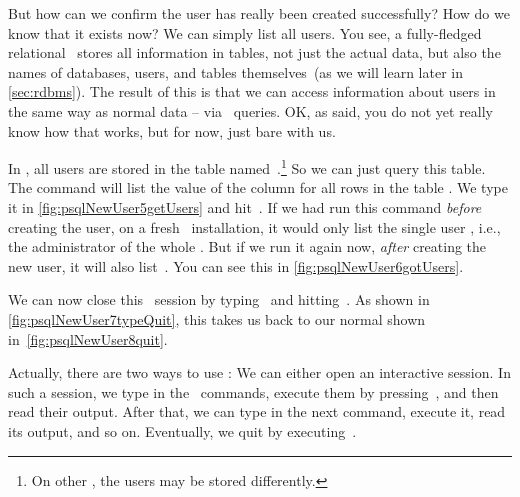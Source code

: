 But how can we confirm the user  has really been created successfully?
How do we know that it exists now?
We can simply list all users.
You see, a fully-fledged relational \dbms\ stores all information in tables, not just the actual data, but also the names of databases, users, and tables themselves~(as we will learn later in \cref{sec:rdbms}).
The result of this is that we can access information about users in the same way as normal data -- via \sql\ queries.
OK, as said, you do not yet really know how that works, but for now, just bare with us.

In \postgresql, all users are stored in the table named~.\footnote{%
On other , the users may be stored differently.}
So we can just query this table.
The \sql{} command  will list the value of the column  for all rows in the table .
We type it in \cref{fig:psqlNewUser5getUsers} and hit~\keys{\enter}.
If we had run this command \emph{before} creating the user, on a fresh \postgresql\ installation, it would only list the single user , i.e., the administrator of the whole \dbms.
But if we run it again now, \emph{after} creating the new user, it will also list~.
You can see this in \cref{fig:psqlNewUser6gotUsers}.

We can now close this \psql\ session by typing~\sqlil{\\q} and hitting~\keys{\enter}.
As shown in \cref{fig:psqlNewUser7typeQuit}, this takes us back to our normal   shown in~\cref{fig:psqlNewUser8quit}.

Actually, there are two ways to use \psql:
We can either open an interactive session.
In such a session, we type in the \sql\ commands, execute them by pressing~\keys{\enter}, and then read their output.
After that, we can type in the next command, execute it, read its output, and so on.
Eventually, we quit by executing~\sqlil{\\q}.

